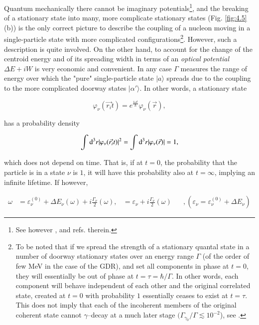 Quantum mechanically there cannot be imaginary potentials\footnote{See however \cite{Caldeira:81}, \cite{Caldeira:83} and refs. therein.}, and the breaking of a stationary state into many, more complicate stationary states (Fig. \ref{fig:4.5}(b)) is the only correct picture to describe the coupling of a nucleon moving in a single-particle state with more complicated configurations\footnote{To be noted that if we spread the strength of a stationary quantal state in a number of doorway stationary states over an energy range $\Gamma$ (of the order of few MeV in the case of the GDR), and set all components in phase at $t=0$, they will essentially be out of phase at $t=\tau = \hbar/\Gamma$. In other words, each component will behave independent of each other and the original correlated state, created at $t=0$ with probability $1$ essentially ceases to exist at $t=\tau$. This does not imply that each of the incoherent members of the original coherent state cannot $\gamma$--decay at a much later stage $(\Gamma_{\gamma_0}/\Gamma\lesssim10^{-2}$), see \cite{Bortignon:98}.}. However, such a description is quite involved. On the other hand, to account for the change of the centroid energy and of its spreading width in terms of an {\it optical potential $\Delta E + iW$} is very economic and convenient. In any case $\Gamma$ measures the range of energy over which the "pure" single-particle state $|a\rangle$ spreads due to the coupling to the more complicated doorway states $|\alpha'\rangle$. In other words, a stationary state

\begin{equation}
\varphi_{\nu}(\vec{r_i}t) = e^{\frac{i\omega t}{\hbar}} \varphi_{\nu}(\vec{r}) ,
\label{eqn:43}
\end{equation}

\noindent has a probability density

\begin{equation}
\int{\rm d}^3 r |\varphi_{\nu}(\vec{r_i}t)|^2 = \int{\rm d}^3 r |\varphi_{\nu}(\vec{r})| = 1 ,
\label{eqn:44}
\end{equation}

\noindent which does not depend on time. That is, if at $t=0$, the probability that the particle is in a state $\nu$ is $1$, it will have this probability also at $t=\infty$, implying an infinite lifetime. If however,

\begin{eqnarray}
\nonumber
\omega &= \varepsilon_{\nu}^{(0)} + \Delta E_{\nu}(\omega) + i \frac{\Gamma_\nu}{2} (\omega),
\nonumber
&= \varepsilon_{\nu} + i \frac{\Gamma_{\nu}}{2}(\omega) \;\;\;\;\;\; , (\varepsilon_{\nu} = \varepsilon_{\nu}^{(0)} + \Delta E_{\nu})
\end{eqnarray}

